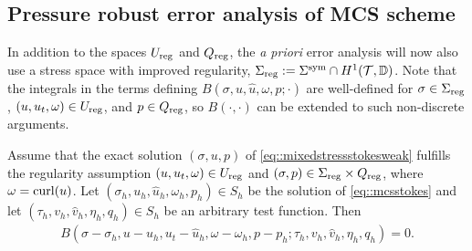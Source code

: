 \subsection{Pressure robust error analysis of MCS scheme}


In addition to the spaces $U_{\operatorname{reg}}$ and $Q_{\operatorname{reg}}$, the {\it a priori}
error analysis will now also use a stress space with improved
regularity,
$ \Sigma_{\operatorname{reg}} := \Sigma^{\operatorname{sym}} \cap H^1(\mathcal{T}, \mathbb{D})$.  Note
that the integrals in the terms defining
$B(\sigma, u, \hat u, \omega, p; \cdot)$ are well-defined for
$\sigma \in \Sigma_{\operatorname{reg}}$, $(u, u_t, \omega) \in U_{\operatorname{reg}}$, and $p\in Q_{\operatorname{reg}}$, so
$B(\cdot, \cdot)$ can be extended to such non-discrete arguments.

\begin{lemma}
  \label{lemma::mcs_cosistency}
  Assume that the exact solution $(\sigma, u,p)$ of
  \eqref{eq::mixedstressstokesweak} fulfills the regularity assumption
  $(u, u_t, \omega) \in U_{\operatorname{reg}} $ and
  $(\sigma, p) \in \Sigma_{\operatorname{reg}} \times Q_{\operatorname{reg}}$, where $\omega = \operatorname{curl}(u)$. Let
  $(\sigma_h, u_h, \hat u_h, \omega_h, p_h) \in S_h$ be the solution of
  \eqref{eq::mcsstokes}
  and let $(\tau_h, v_h, \hat v_h, \eta_h, q_h) \in S_h$ be an
  arbitrary test function. Then 
\begin{align}\label{eq::mcs_cosistency}
  B(\sigma - \sigma_h,  u-u_h, u_t - \hat u_h, \omega - \omega_h, p - p_h; \tau_h, v_h, \hat{v}_h, \eta_h, q_h) = 0.
\end{align}
\end{lemma}
